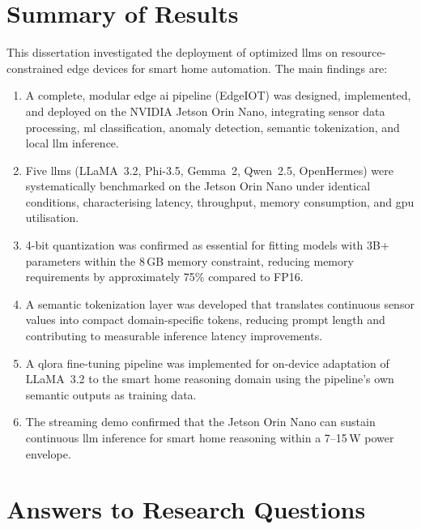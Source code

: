 \documentclass[12pt,a4paper,oneside]{report}
\begin{document}
\section{Summary of Results}
\label{sec:conc-summary}

This dissertation investigated the deployment of optimized \glspl{llm} on resource-constrained edge devices for smart home automation. The main findings are:

\begin{enumerate}
    \item A complete, modular edge \gls{ai} pipeline (EdgeIOT) was designed, implemented, and deployed on the NVIDIA Jetson Orin Nano, integrating sensor data processing, \gls{ml} classification, anomaly detection, semantic tokenization, and local \gls{llm} inference.

    \item Five \glspl{llm} (LLaMA~3.2, Phi-3.5, Gemma~2, Qwen~2.5, OpenHermes) were systematically benchmarked on the Jetson Orin Nano under identical conditions, characterising latency, throughput, memory consumption, and \gls{gpu} utilisation.

    \item 4-bit quantization was confirmed as essential for fitting models with 3B+ parameters within the 8\,GB memory constraint, reducing memory requirements by approximately 75\% compared to FP16.

    \item A semantic tokenization layer was developed that translates continuous sensor values into compact domain-specific tokens, reducing prompt length and contributing to measurable inference latency improvements.

    \item A \gls{qlora} fine-tuning pipeline was implemented for on-device adaptation of LLaMA~3.2 to the smart home reasoning domain using the pipeline's own semantic outputs as training data.

    \item The streaming demo confirmed that the Jetson Orin Nano can sustain continuous \gls{llm} inference for smart home reasoning within a 7--15\,W power envelope.
\end{enumerate}


\section{Answers to Research Questions}
\label{sec:conc-rqs}
\end{document}
